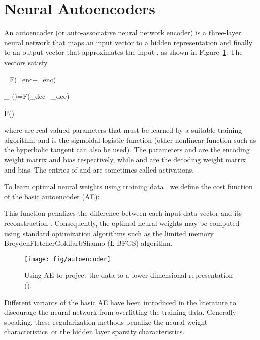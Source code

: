 \documentclass[a4paper,onecolumn,conference]{IEEEtran}
\begin{document}
\section{Neural Autoencoders}\label{sec:preliminaries}

An autoencoder (or auto-associative neural network encoder) is a three-layer neural network that maps an input vector  to a hidden representation  and finally to an output vector  that approximates the input , as shown in Figure~\ref{fig:basic_autoencoder}. The vectors satisfy

=F\left(_{enc}+_{enc}\right)

_{\boldsymbol{\theta} }()=F\left(_{dec}+_{dec}\right)

F\left(\upsilon\right)=

where  are real-valued parameters that must be learned by a suitable training algorithm, and  is the sigmoidal logistic function (other nonlinear function such as the hyperbolic tangent can also be used). The parameters  and  are the encoding weight matrix and bias respectively, while  and  are the decoding weight matrix and bias. The entries of  and  are sometimes called activations.

To learn optimal neural weights  using training data , we define the cost function of the basic autoencoder (AE):

This function penalizes the difference between each input data vector  and its reconstruction . Consequently, the optimal neural weights may be computed using standard optimization algorithms such as the limited memory Broyden\textendash{}Fletcher\textendash{}Goldfarb\textendash{}Shanno (L-BFGS) algorithm.

\begin{figure}
\begin{centering}
\texttt{[image: fig/autoencoder]}
\par\end{centering}
\caption{\label{fig:basic_autoencoder}Using AE to project the data to a lower dimensional representation ().}
\end{figure}

Different variants of the basic AE have been introduced in the literature to discourage the neural network from overfitting the training data. Generally speaking, these regularization methods penalize the neural weight characteristics~or the hidden layer sparsity characteristics.
\end{document}
